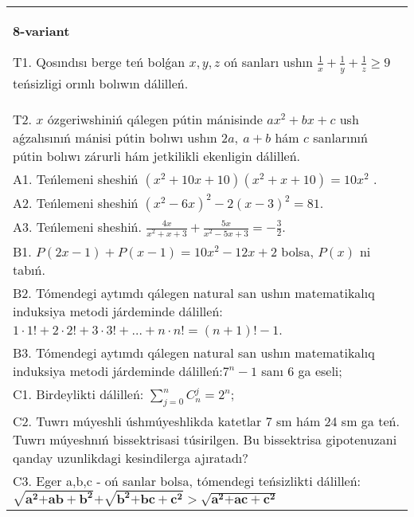 \documentclass{article}
\begin{document}
\begin{tabular}{m{17cm}}
\textbf{8-variant}
\newline

T1. Qosındısı berge teń bolǵan \(x,y,z\) oń sanları ushın \(\frac{1}{x} + \frac{1}{y} + \frac{1}{z} \geq 9\) teńsizligi orınlı bolıwın dálilleń. \\
T2. \(x\) ózgeriwshiniń qálegen pútin mánisinde \(ax^{2} + bx + c\) ush aǵzalısınıń mánisi pútin bolıwı ushın \(2a,\ a + b\) hám \(c\) sanlarınıń pútin bolıwı zárurli hám jetkilikli ekenligin dálilleń. \\
A1. Teńlemeni sheshiń \(\left( x^{2} + 10x + 10 \right)\left( x^{2} + x + 10 \right) = 10x^{2}\) . \\
A2. Teńlemeni sheshiń \(\left( x^{2} - 6x \right)^{2} - 2(x - 3)^{2} = 81\). \\
A3. Teńlemeni sheshiń. \(\frac{4x}{x^{2} + x + 3} + \frac{5x}{x^{2} - 5x + 3} = - \frac{3}{2}\). \\
B1. \(P(2x - 1) + P(x - 1) = 10x^{2} - 12x + 2\) bolsa, \(P(x)\) ni tabıń. \\
B2. Tómendegi aytımdı qálegen natural san ushın matematikalıq induksiya metodi járdeminde dálilleń: \(1 \cdot 1! + 2 \cdot 2! + 3 \cdot 3! + \ldots + n \cdot n! = (n + 1)! - 1\). \\
B3. Tómendegi aytımdı qálegen natural san ushın matematikalıq induksiya metodi járdeminde dálilleń:\(7^{n} - 1\) sanı 6 ga eseli; \\
C1. Birdeylikti dálilleń: \(\sum_{j = 0}^{n}C_{n}^{j} = 2^{n}\); \\
C2. Tuwrı múyeshli úshmúyeshlikda katetlar 7 sm hám 24 sm ga teń. Tuwrı múyeshnıń bissektrisasi túsirilgen. Bu bissektrisa gipotenuzani qanday uzunlikdagi kesindilerga ajıratadı? \\
C3. Eger a,b,c - oń sanlar bolsa, tómendegi teńsizlikti dálilleń: \(\sqrt{\mathbf{a}^{\mathbf{2}}\mathbf{+ ab +}\mathbf{b}^{\mathbf{2}}}\mathbf{+}\sqrt{\mathbf{b}^{\mathbf{2}}\mathbf{+ bc +}\mathbf{c}^{\mathbf{2}}}\mathbf{>}\sqrt{\mathbf{a}^{\mathbf{2}}\mathbf{+ ac +}\mathbf{c}^{\mathbf{2}}}\) \\

\end{tabular}
\vspace{1cm}
\end{document}

